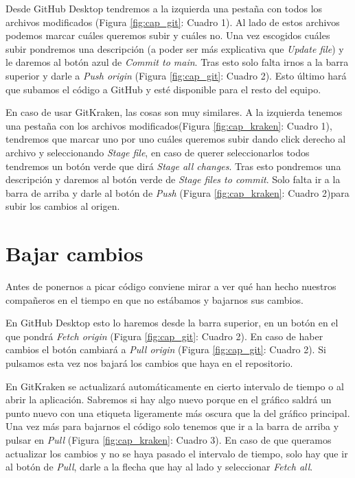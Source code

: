 Desde GitHub Desktop tendremos a la izquierda una pestaña con todos los archivos modificados (Figura \ref{fig:cap_git}: Cuadro 1). Al lado de estos archivos podemos marcar cuáles queremos subir y cuáles no.
Una vez escogidos cuáles subir pondremos una descripción (a poder ser más explicativa que \textit{Update file}) y le daremos al botón azul de \textit{Commit to main}. Tras esto solo falta irnos a la barra superior y darle a \textit{Push origin} (Figura \ref{fig:cap_git}: Cuadro 2). Esto último hará que subamos el código a GitHub y esté disponible para el resto del equipo.

En caso de usar GitKraken, las cosas son muy similares. A la izquierda tenemos una pestaña con los archivos modificados(Figura \ref{fig:cap_kraken}: Cuadro 1), tendremos que marcar uno por uno cuáles queremos subir dando click derecho al archivo y seleccionando \textit{Stage file}, en caso de querer seleccionarlos todos tendremos un botón verde que dirá \textit{Stage all changes}.
Tras esto pondremos una descripción y daremos al botón verde de \textit{Stage files to commit}. Solo falta ir a la barra de arriba y darle al botón de \textit{Push} (Figura \ref{fig:cap_kraken}: Cuadro 2)para subir los cambios al origen.

\section{Bajar cambios}

Antes de ponernos a picar código conviene mirar a ver qué han hecho nuestros compañeros en el tiempo en que no estábamos y bajarnos sus cambios.

En GitHub Desktop esto lo haremos desde la barra superior, en un botón en el que pondrá \textit{Fetch origin} (Figura \ref{fig:cap_git}: Cuadro 2). En caso de haber cambios el botón cambiará a \textit{Pull origin} (Figura \ref{fig:cap_git}: Cuadro 2). Si pulsamos esta vez nos bajará los cambios que haya en el repositorio.

En GitKraken se actualizará automáticamente en cierto intervalo de tiempo o al abrir la aplicación. Sabremos si hay algo nuevo porque en el gráfico saldrá un punto nuevo con una etiqueta ligeramente más oscura que la del gráfico principal. Una vez más para bajarnos el código solo tenemos que ir a la barra de arriba y pulsar en \textit{Pull} (Figura \ref{fig:cap_kraken}: Cuadro 3). En caso de que queramos actualizar los cambios y no se haya pasado el intervalo de tiempo, solo hay que ir al botón  de \textit{Pull}, darle a la flecha que hay al lado y seleccionar \textit{Fetch all}.

